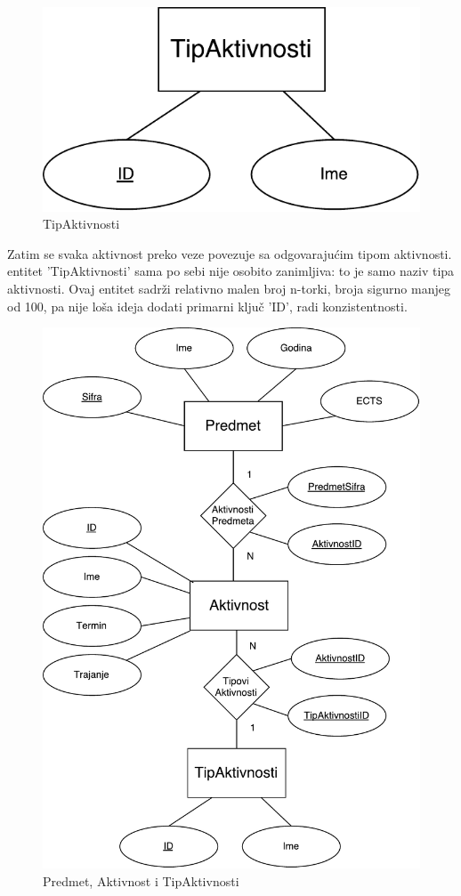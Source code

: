 \documentclass[times, utf8, zavrsni]{fer}
\begin{document}
\begin{figure}[H]
\centering
\includegraphics[keepaspectratio]{img/tip-aktivnosti.pdf}
\caption{TipAktivnosti}
\label{fig:tip-aktivnosti}
\end{figure}

Zatim se svaka aktivnost preko veze povezuje sa odgovarajućim tipom aktivnosti. entitet 'TipAktivnosti' sama po sebi nije osobito zanimljiva: to je samo naziv tipa aktivnosti. Ovaj entitet sadrži relativno malen broj n-torki, broja sigurno manjeg od 100, pa nije loša ideja dodati primarni ključ 'ID', radi konzistentnosti.

\begin{figure}[H]
\centering
\includegraphics[width=\textwidth,height=\textheight,keepaspectratio]{img/predmet-aktivnost-tip.pdf}
\caption{Predmet, Aktivnost i TipAktivnosti}
\label{fig:predmet-aktivnost-tip}
\end{figure}
\end{document}
